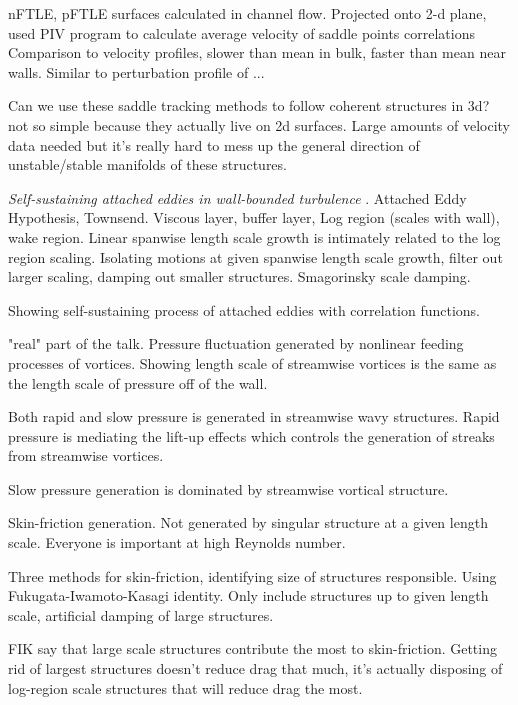 \begin{description}
{\begin{description}
nFTLE, pFTLE surfaces calculated in channel flow. Projected onto 2-d plane,
used PIV program to calculate average velocity of saddle points correlations
Comparison to velocity profiles, slower than mean in bulk, faster than mean
near walls. Similar to perturbation profile of ...

Can we use these saddle tracking methods to follow coherent structures in 3d?
not so simple because they actually live on 2d surfaces.
Large amounts of velocity data needed but it's really hard to mess up the general
direction of unstable/stable manifolds of these structures.

\item[Y. Hwang Talk]
\textit{Self-sustaining attached eddies in wall-bounded turbulence}
.
Attached Eddy Hypothesis, Townsend. Viscous layer, buffer layer, Log region (scales with wall),
wake region.
Linear spanwise length scale growth is intimately related to the log region scaling.
Isolating motions at given spanwise length scale growth, filter out larger scaling,
damping out smaller structures. Smagorinsky scale damping.

Showing self-sustaining process of attached eddies with correlation functions.

"real" part of the talk. Pressure fluctuation generated by nonlinear feeding processes
of vortices.
Showing length scale of streamwise vortices is the same as the length scale of pressure
off of the wall.

Both rapid and slow pressure is generated in streamwise wavy structures. Rapid
pressure is mediating the lift-up effects which controls the generation of
streaks from streamwise vortices.

Slow pressure generation is dominated by streamwise vortical structure.

Skin-friction generation. Not generated by singular structure at a given
length scale. Everyone is important at high Reynolds number.

Three methods for skin-friction, identifying size of structures responsible.
Using Fukugata-Iwamoto-Kasagi identity. Only include structures up to given length scale,
artificial damping of large structures.

FIK say that large scale structures contribute the most to skin-friction. Getting
rid of largest structures doesn't reduce drag that much, it's actually disposing
of log-region scale structures that will reduce drag the most.


\end{description}}
\end{description}
